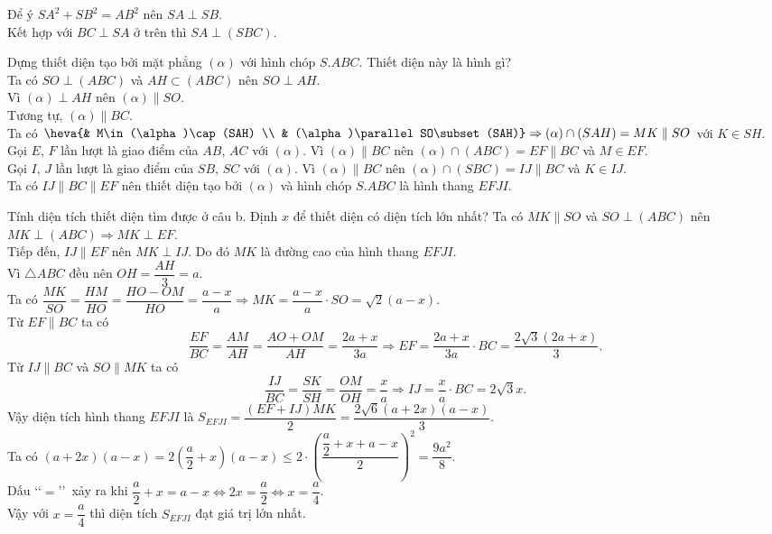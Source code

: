 \begin{vd}
{\begin{listEX}
{\begin{tikzpicture}[scale=1, font=\footnotesize, line join=round, line cap=round,>=stealth]
			\end{tikzpicture}}\noindent
			Để ý $SA^2+SB^2=AB^2$ nên $SA\perp SB$.\\
			Kết hợp với $BC\perp SA$ ở trên thì $SA\perp (SBC)$.
			\item Dựng thiết diện tạo bởi mặt phẳng $(\alpha)$ với hình chóp $S.ABC$. Thiết diện này là hình gì?\\
			Ta có $SO\perp (ABC)$ và $AH\subset (ABC)$ nên $SO\perp AH$.\\
			Vì $(\alpha)\perp AH$ nên $(\alpha)\parallel SO$.\\
			Tương tự, $(\alpha)\parallel BC$.\\
			Ta có $\heva{& M\in (\alpha)\cap (SAH) \\ & (\alpha)\parallel SO\subset (SAH)}\Rightarrow (\alpha)\cap (SAH)=MK\parallel SO$ với $K\in SH$.\\
			Gọi $E$, $F$ lần lượt là giao điểm của $AB$, $AC$ với $(\alpha)$. Vì $(\alpha)\parallel BC$ nên $(\alpha)\cap (ABC)=EF\parallel BC$ và $M\in EF$.\\
			Gọi $I$, $J$ lần lượt là giao điểm của $SB$, $SC$ với $(\alpha)$. Vì $(\alpha)\parallel BC$ nên $(\alpha)\cap (SBC)=IJ\parallel BC$ và $K\in IJ$.\\
			Ta có $IJ\parallel BC\parallel EF$ nên thiết diện tạo bởi $(\alpha)$ và hình chóp $S.ABC$ là hình thang $EFJI$.
			\item Tính diện tích thiết diện tìm được ở câu b. Định $x$ để thiết diện có diện tích lớn nhất?
			Ta có $MK\parallel SO$ và $SO\perp (ABC)$ nên $MK\perp (ABC)\Rightarrow MK\perp EF$.\\
			Tiếp đến, $IJ\parallel EF$ nên $MK\perp IJ$. Do đó $MK$ là đường cao của hình thang $EFJI$.\\
			Vì $\triangle ABC$ đều nên $OH=\dfrac{AH}{3}=a$.\\
			Ta có $\dfrac{MK}{SO}=\dfrac{HM}{HO}=\dfrac{HO-OM}{HO}=\dfrac{a-x}{a}\Rightarrow MK=\dfrac{a-x}{a}\cdot SO=\sqrt{2}(a-x)$.\\
			Từ $EF\parallel BC$ ta có $$\dfrac{EF}{BC}=\dfrac{AM}{AH}=\dfrac{AO+OM}{AH}=\dfrac{2a+x}{3a}\Rightarrow EF=\dfrac{2a+x}{3a}\cdot BC=\dfrac{2\sqrt{3}(2a+x)}{3}.$$
			Từ $IJ\parallel BC$ và $SO\parallel MK$ ta có $$\dfrac{IJ}{BC}=\dfrac{SK}{SH}=\dfrac{OM}{OH}=\dfrac{x}{a}\Rightarrow IJ=\dfrac{x}{a}\cdot BC=2\sqrt{3}x.$$
			Vậy diện tích hình thang $EFJI$ là $S_{EFJI}=\dfrac{(EF+IJ)MK}{2}=\dfrac{2\sqrt{6}(a+2x)(a-x)}{3}$.\\
			Ta có $(a+2x)(a-x)=2\left(\dfrac{a}{2}+x\right)(a-x)\leq 2\cdot\left(\dfrac{\dfrac{a}{2}+x+a-x}{2}\right)^2=\dfrac{9a^2}{8}$.\\
			Dấu \lq\lq $=$\rq\rq\ xảy ra khi $\dfrac{a}{2}+x=a-x\Leftrightarrow 2x=\dfrac{a}{2}\Leftrightarrow x=\dfrac{a}{4}$.\\
			Vậy với $x=\dfrac{a}{4}$ thì diện tích $S_{EFJI}$ đạt giá trị lớn nhất.
		\end{listEX}
	}	
\end{vd}

